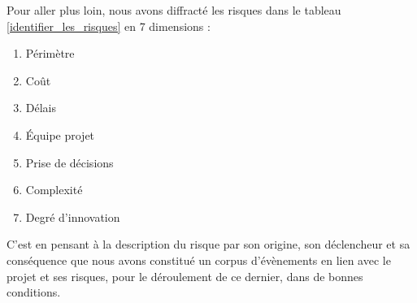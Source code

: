 \documentclass[12pt]{article}
\begin{document}
Pour aller plus loin, nous avons diffracté les risques dans le tableau \ref{identifier_les_risques} en 7 dimensions :
\begin{enumerate}
	\item Périmètre
	\item Coût
	\item Délais
	\item Équipe projet
	\item Prise de décisions
	\item Complexité
	\item Degré d’innovation
\end{enumerate}

C’est en pensant à la description du risque par son origine, son déclencheur et sa conséquence que nous avons constitué un corpus d’évènements en lien avec le projet et ses risques, pour le déroulement de ce dernier, dans de bonnes conditions.
\end{document}
